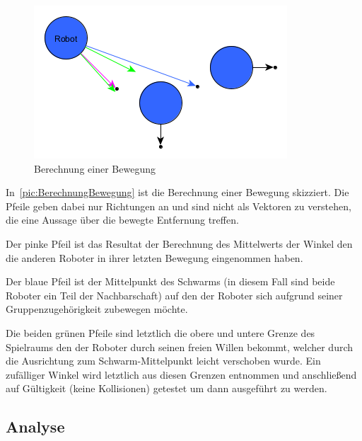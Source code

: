 \begin{figure}
	\includegraphics[width=\pictureWidth,keepaspectratio]{graphics/BerechnungBewegung.png}
	\caption{Berechnung einer Bewegung}
	\label{pic:BerechnungBewegung}
\end{figure}

In~\autoref{pic:BerechnungBewegung} ist die Berechnung einer Bewegung skizziert. Die Pfeile geben dabei nur Richtungen an und sind nicht als Vektoren zu verstehen, die eine Aussage über die bewegte Entfernung treffen.

Der pinke Pfeil ist das Resultat der Berechnung des Mittelwerts der Winkel den die anderen Roboter in ihrer letzten Bewegung eingenommen haben.

Der blaue Pfeil ist der Mittelpunkt des Schwarms (in diesem Fall sind beide Roboter ein Teil der Nachbarschaft) auf den der Roboter sich aufgrund seiner Gruppenzugehörigkeit zubewegen möchte.

Die beiden grünen Pfeile sind letztlich die obere und untere Grenze des Spielraums den der Roboter durch seinen freien Willen bekommt, welcher durch die Ausrichtung zum Schwarm-Mittelpunkt leicht verschoben wurde. Ein zufälliger Winkel wird letztlich aus diesen Grenzen entnommen und anschließend auf Gültigkeit (keine Kollisionen) getestet um dann ausgeführt zu werden.

\subsection*{Analyse}


